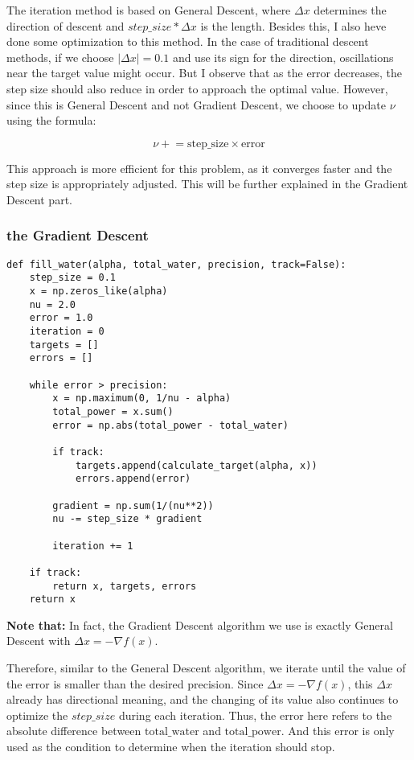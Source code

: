 \documentclass[a4paper,12pt]{article}
\begin{document}
The iteration method is based on General Descent, where $\Delta x$ determines the direction of descent and $step\_size * \Delta x$ is the length. Besides this, I also heve done some optimization to this method. In the case of traditional descent methods, if we choose \( |\Delta x| = 0.1 \) and use its sign for the direction, oscillations near the target value might occur. But I observe that as the error decreases, the step size should also reduce in order to approach the optimal value. However, since this is General Descent and not Gradient Descent, we choose to update $\nu$ using the formula:

\[
\nu \mathrel{+}= \text{step\_size} \times \text{error}
\]

This approach is more efficient for this problem, as it converges faster and the step size is appropriately adjusted. This will be further explained in the Gradient Descent part.
    \subsubsection{the Gradient Descent}
\begin{lstlisting}
def fill_water(alpha, total_water, precision, track=False):
    step_size = 0.1
    x = np.zeros_like(alpha)
    nu = 2.0
    error = 1.0
    iteration = 0
    targets = []
    errors = []
    
    while error > precision:
        x = np.maximum(0, 1/nu - alpha)
        total_power = x.sum()
        error = np.abs(total_power - total_water)
        
        if track:
            targets.append(calculate_target(alpha, x))
            errors.append(error)
        
        gradient = np.sum(1/(nu**2))
        nu -= step_size * gradient
        
        iteration += 1
        
    if track:
        return x, targets, errors
    return x
\end{lstlisting}
\textbf{Note that:} In fact, the Gradient Descent algorithm we use is exactly General Descent with $\Delta x = -\nabla f(x)$.

Therefore, similar to the General Descent algorithm, we iterate until the value of the error is smaller than the desired precision. Since \( \Delta x = -\nabla f(x) \), this \( \Delta x \) already has directional meaning, and the changing of its value also continues to optimize the $step\_size$ during each iteration. Thus, the error here refers to the absolute difference between \( \text{total\_water} \) and \( \text{total\_power} \). And this error is only used as the condition to determine when the iteration should stop.
\end{document}
